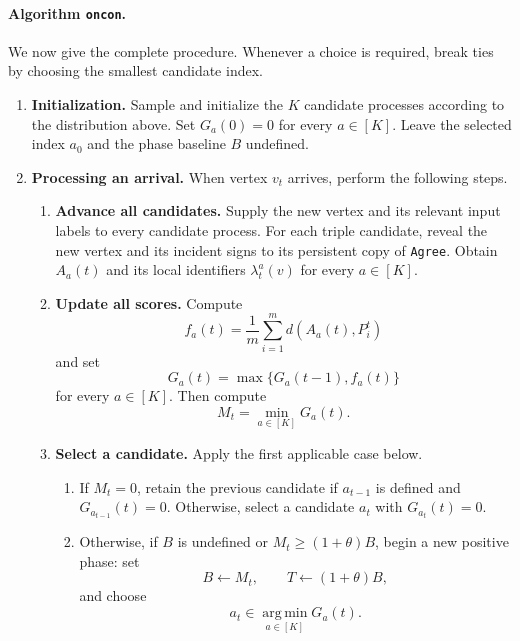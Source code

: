 \documentclass[11pt]{article}
\theoremstyle{definition}
\theoremstyle{remark}
\newcommand{\1}{\mathbf{1}}
\begin{document}
\paragraph{Algorithm \texttt{oncon}.}
We now give the complete procedure. Whenever a choice is required,
break ties by choosing the smallest candidate index.
\begin{enumerate}
    \item \textbf{Initialization.}
    Sample and initialize the $K$ candidate processes according to
    the distribution above. Set $G_a(0)=0$ for every $a\in[K]$.
    Leave the selected index $a_0$ and the phase baseline $B$
    undefined.

    \item \textbf{Processing an arrival.}
    When vertex $v_t$ arrives, perform the following steps.
    \begin{enumerate}
        \item \textbf{Advance all candidates.}
        Supply the new vertex and its relevant input labels to every
        candidate process. For each triple candidate, reveal the new
        vertex and its incident signs to its persistent copy of
        \texttt{Agree}. Obtain $A_a(t)$ and its local identifiers
        $\lambda_t^a(v)$ for every $a\in[K]$.

        \item \textbf{Update all scores.}
        Compute
        \[
            f_a(t)=\frac{1}{m}\sum_{i=1}^{m}d(A_a(t),P_i^t)
        \]
        and set
        \[
            G_a(t)=\max\{G_a(t-1),f_a(t)\}
        \]
        for every $a\in[K]$. Then compute
        \[
            M_t=\min_{a\in[K]}G_a(t).
        \]

        \item \textbf{Select a candidate.}
        Apply the first applicable case below.
        \begin{enumerate}
            \item If $M_t=0$, retain the previous candidate if
            $a_{t-1}$ is defined and $G_{a_{t-1}}(t)=0$.
            Otherwise, select a candidate $a_t$ with $G_{a_t}(t)=0$.

            \item Otherwise, if $B$ is undefined or
            $M_t\geq(1+\theta)B$, begin a new positive phase:
            set
            \[
                B\leftarrow M_t,
                \qquad
                T\leftarrow(1+\theta)B,
            \]
            and choose
            \[
                a_t\in\operatorname*{arg\,min}_{a\in[K]}G_a(t).
            \]


\end{enumerate}
\end{enumerate}
\end{enumerate}
\end{document}
